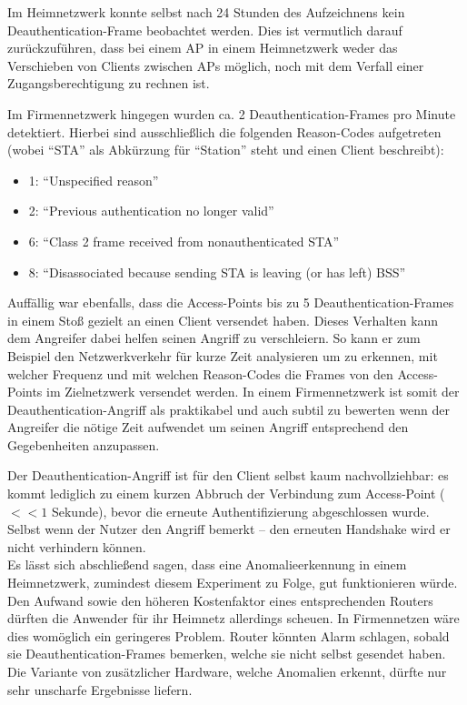 Im Heimnetzwerk konnte selbst nach 24 Stunden des Aufzeichnens kein Deauthentication-Frame beobachtet werden. Dies ist vermutlich darauf zurückzuführen, dass bei einem AP in einem Heimnetzwerk weder das Verschieben von Clients zwischen APs möglich, noch mit dem Verfall einer Zugangsberechtigung zu rechnen ist.

Im Firmennetzwerk hingegen wurden ca. 2 Deauthentication-Frames pro Minute detektiert.
Hierbei sind ausschließlich die folgenden Reason-Codes aufgetreten (wobei \enquote{STA} als Abkürzung für \enquote{Station} steht und einen Client beschreibt):
\begin{itemize}
	\item 1: \enquote{Unspecified reason}
	\item 2: \enquote{Previous authentication no longer valid}
	\item 6: \enquote{Class 2 frame received from nonauthenticated STA}
	\item 8: \enquote{Disassociated because sending STA is leaving (or has left) BSS}
\end{itemize}
Auffällig war ebenfalls, dass die Access-Points bis zu 5 Deauthentication-Frames in einem Stoß gezielt an einen Client versendet haben.
Dieses Verhalten kann dem Angreifer dabei helfen seinen Angriff zu verschleiern.
So kann er zum Beispiel den Netzwerkverkehr für kurze Zeit analysieren um zu erkennen, mit welcher Frequenz und mit welchen Reason-Codes die Frames von den Access-Points im Zielnetzwerk versendet werden.
In einem Firmennetzwerk ist somit der Deauthentication-Angriff als praktikabel und auch subtil zu bewerten wenn der Angreifer die nötige Zeit aufwendet um seinen Angriff entsprechend den Gegebenheiten anzupassen.

Der Deauthentication-Angriff ist für den Client selbst kaum nachvollziehbar: es kommt lediglich zu einem kurzen Abbruch der Verbindung zum Access-Point ($<< 1$ Sekunde), bevor die erneute Authentifizierung abgeschlossen wurde. Selbst wenn der Nutzer den Angriff bemerkt -- den erneuten Handshake wird er nicht verhindern können.\\

Es lässt sich abschließend sagen, dass eine Anomalieerkennung in einem Heimnetzwerk, zumindest diesem Experiment zu Folge, gut funktionieren würde. Den Aufwand sowie den höheren Kostenfaktor eines entsprechenden Routers dürften die Anwender für ihr Heimnetz allerdings scheuen. In Firmennetzen wäre dies womöglich ein geringeres Problem. Router könnten Alarm schlagen, sobald sie Deauthentication-Frames bemerken, welche sie nicht selbst gesendet haben. Die Variante von zusätzlicher Hardware, welche Anomalien erkennt, dürfte nur sehr unscharfe Ergebnisse liefern.\\

